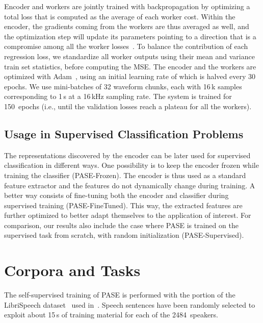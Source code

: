 \documentclass[a4paper]{article}
\begin{document}
Encoder and workers are jointly trained with backpropagation by optimizing a total loss that is computed as the average of each worker cost.
Within the encoder, the gradients coming from the workers are thus averaged as well, and the optimization step will update its parameters pointing to a direction that is a compromise among all the worker losses~\cite{Serra18AIRD}.
To balance the contribution of each regression loss, we standardize all worker outputs using their mean and variance train set statistics, before computing the MSE.
The encoder and the workers are optimized with Adam~\cite{adam}, using an initial learning rate of  which is halved every 30 epochs. We use mini-batches of 32 waveform chunks, each with 16\,k samples corresponding to 1\,s at a 16\,kHz sampling rate. The system is trained for 150~epochs (i.e., until the validation losses reach a plateau for all the workers). 

\subsection{Usage in Supervised Classification Problems}
\label{sec:exp_setup_classif}

The representations discovered by the encoder can be later used for supervised classification in different ways. One possibility is to keep the encoder frozen while training the classifier (PASE-Frozen). The encoder is thus used as a standard feature extractor and the features do not dynamically change during training. A better way consists of fine-tuning both the encoder and classifier during supervised training (PASE-FineTuned). This way, the extracted features are further optimized to better adapt themselves to the application of interest. 
For comparison, our results also include the case where PASE is trained on the supervised task from scratch, with random initialization (PASE-Supervised).

\section{Corpora and Tasks}
\label{sec:exp_setup_corpora}

The self-supervised training of PASE is performed with the portion of the LibriSpeech dataset~\cite{librispeech} used in~\cite{ravanelli2018learning}. 
Speech sentences have been randomly selected to exploit about 15\,s of training material for each of the 2484~speakers. 
\end{document}
